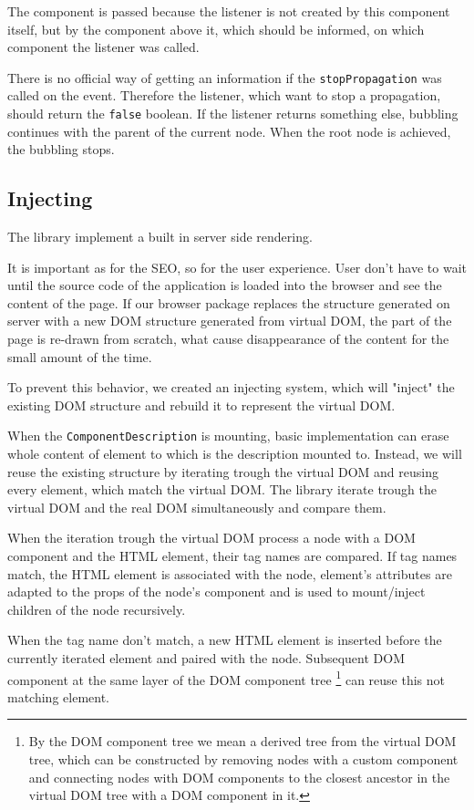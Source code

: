       The component is passed because the listener is not created by this component itself, 
      but by the component above it, which should be informed, on which component the listener was called.

      There is no official way of getting an information if the \texttt{stopPropagation} was called on the event.
      Therefore the listener, which want to stop a propagation, should return the \texttt{false} boolean.
      If the listener returns something else, bubbling continues with the parent of the current node.
      When the root node is achieved, the bubbling stops.

  \subsection{Injecting}\label{subsec:our-architecture-injecting}

    The \tiles library implement a built in server side rendering.

    It is important as for the SEO, so for the user experience. 
    User don't have to wait until the source code of the application is loaded into the browser and see the content of the page. 
    If our browser package replaces the structure generated on server with a new DOM structure 
    generated from virtual DOM, the part of the page is re-drawn from scratch,
    what cause disappearance of the content for the small amount of the time.

    To prevent this behavior, we created an injecting system, which will "inject" the existing DOM structure 
    and rebuild it to represent the virtual DOM.

    When the \texttt{ComponentDescription} is mounting, 
    basic implementation can erase whole content of element to which is the description mounted to.
    Instead, we will reuse the existing structure by iterating trough the virtual DOM and reusing every element, which match the virtual DOM. 
    The \tiles library iterate trough the virtual DOM and the real DOM simultaneously and compare them. 

    When the iteration trough the virtual DOM process a node with a DOM component and the HTML element,
    their tag names are compared.
    If tag names match, the HTML element is associated with the node, 
    element's attributes are adapted to the props of the node's component 
    and is used to mount/inject children of the node recursively.

    When the tag name don't match, 
    a new HTML element is inserted before the currently iterated element and paired with the node. 
    Subsequent DOM component at the same layer of the DOM component tree
    \footnote{
      By the DOM component tree we mean a derived tree from the virtual DOM tree, 
      which can be constructed by removing nodes with a custom component
      and connecting nodes with DOM components to the closest ancestor in the virtual DOM tree with a DOM component in it.
    }
    can reuse this not matching element.

